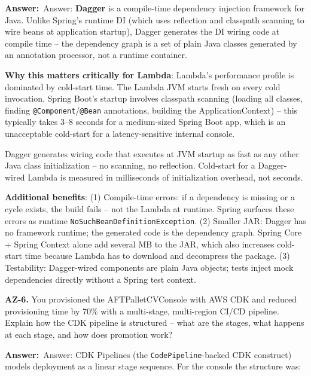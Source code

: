 \documentclass[letterpaper,10pt]{article}
\newlength{\boxwidth}
\newcommand{\answerlabel}{\noindent\textbf{\textcolor{answerblue}{Answer:}}~}
\begin{document}
\vspace{2pt}
\answerlabel{Answer:} \textbf{Dagger} is a compile-time dependency injection framework for Java. Unlike Spring's runtime DI (which uses reflection and classpath scanning to wire beans at application startup), Dagger generates the DI wiring code at compile time -- the dependency graph is a set of plain Java classes generated by an annotation processor, not a runtime container.

\textbf{Why this matters critically for Lambda}: Lambda's performance profile is dominated by cold-start time. The Lambda JVM starts fresh on every cold invocation. Spring Boot's startup involves classpath scanning (loading all classes, finding \texttt{@Component}/\texttt{@Bean} annotations, building the ApplicationContext) -- this typically takes 3--8 seconds for a medium-sized Spring Boot app, which is an unacceptable cold-start for a latency-sensitive internal console.

Dagger generates wiring code that executes at JVM startup as fast as any other Java class initialization -- no scanning, no reflection. Cold-start for a Dagger-wired Lambda is measured in milliseconds of initialization overhead, not seconds.

\textbf{Additional benefits}: (1) Compile-time errors: if a dependency is missing or a cycle exists, the build fails -- not the Lambda at runtime. Spring surfaces these errors as runtime \texttt{NoSuchBeanDefinitionException}. (2) Smaller JAR: Dagger has no framework runtime; the generated code is the dependency graph. Spring Core + Spring Context alone add several MB to the JAR, which also increases cold-start time because Lambda has to download and decompress the package. (3) Testability: Dagger-wired components are plain Java objects; tests inject mock dependencies directly without a Spring test context.

\vspace{6pt}

\colorbox{qbg}{\begin{minipage}{\boxwidth}
\textbf{AZ-6.} You provisioned the AFTPalletCVConsole with AWS CDK and reduced provisioning time by 70\% with a multi-stage, multi-region CI/CD pipeline. Explain how the CDK pipeline is structured -- what are the stages, what happens at each stage, and how does promotion work?
\end{minipage}}

\vspace{2pt}
\answerlabel{Answer:} CDK Pipelines (the \texttt{CodePipeline}-backed CDK construct) models deployment as a linear stage sequence. For the console the structure was:
\end{document}

